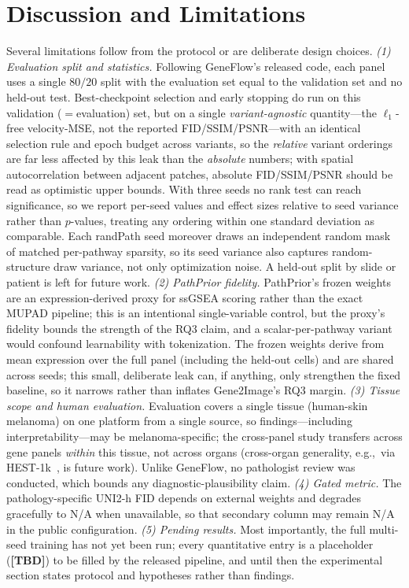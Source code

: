 \documentclass[journal]{IEEEtran}
\newcommand{\TBD}{{\color{red}\textbf{[TBD]}}}
\newcommand{\method}{Gene2Image}
\newcommand{\eg}{e.g.,}
\begin{document}
\section{Discussion and Limitations}
\label{sec:discussion}
Several limitations follow from the protocol or are deliberate design choices.
\emph{(1) Evaluation split and statistics.} Following GeneFlow's released code, each
panel uses a single $80/20$ split with the evaluation set equal to the validation
set and no held-out test. Best-checkpoint selection and early stopping do run on this validation
($=$evaluation) set, but on a single \emph{variant-agnostic} quantity---the
$\ell_1$-free velocity-MSE, not the reported FID/SSIM/PSNR---with an identical
selection rule and epoch budget across variants, so the \emph{relative} variant
orderings are far less affected by this leak than the \emph{absolute} numbers; with spatial autocorrelation between adjacent
patches, absolute FID/SSIM/PSNR should be read as optimistic upper bounds. With
three seeds no rank test can reach significance, so we report per-seed values and
effect sizes relative to seed variance rather than $p$-values, treating any ordering
within one standard deviation as comparable. Each randPath seed moreover draws an
independent random mask of matched per-pathway sparsity, so its seed variance also
captures random-structure draw variance, not only optimization noise. A held-out
split by slide or patient is left for future work.
\emph{(2) PathPrior fidelity.} PathPrior's frozen weights are an
expression-derived proxy for ssGSEA scoring rather than the exact MUPAD pipeline;
this is an intentional single-variable control, but the proxy's fidelity bounds
the strength of the RQ3 claim, and a scalar-per-pathway variant would confound
learnability with tokenization. The frozen weights derive from mean expression over
the full panel (including the held-out cells) and are shared across seeds; this
small, deliberate leak can, if anything, only strengthen the fixed baseline, so it
narrows rather than inflates \method's RQ3 margin.
\emph{(3) Tissue scope and human evaluation.} Evaluation covers a single tissue
(human-skin melanoma) on one platform from a single source, so findings---including
interpretability---may be melanoma-specific; the cross-panel study transfers across
gene panels \emph{within} this tissue, not across organs (cross-organ generality,
\eg\ via HEST-1k~\cite{hest}, is future work). Unlike GeneFlow, no pathologist
review was conducted, which bounds any diagnostic-plausibility claim.
\emph{(4) Gated metric.} The pathology-specific UNI2-h FID depends on external
weights and degrades gracefully to N/A when unavailable, so that secondary column
may remain N/A in the public configuration.
\emph{(5) Pending results.} Most importantly, the full multi-seed training has not
yet been run; every quantitative entry is a placeholder (\TBD) to be filled by the
released pipeline, and until then the experimental section states protocol and
hypotheses rather than findings.
\end{document}
